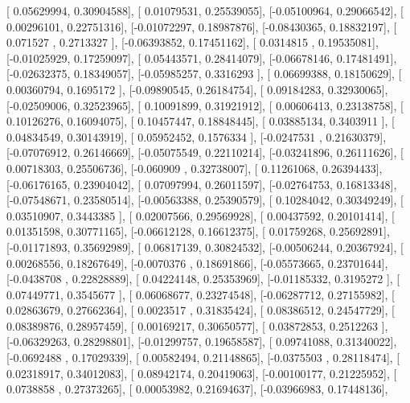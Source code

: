 \documentclass{article}
\begin{document}
       [ 0.05629994,  0.30904588],
       [ 0.01079531,  0.25539055],
       [-0.05100964,  0.29066542],
       [ 0.00296101,  0.22751316],
       [-0.01072297,  0.18987876],
       [-0.08430365,  0.18832197],
       [ 0.071527  ,  0.2713327 ],
       [-0.06393852,  0.17451162],
       [ 0.0314815 ,  0.19535081],
       [-0.01025929,  0.17259097],
       [ 0.05443571,  0.28414079],
       [-0.06678146,  0.17481491],
       [-0.02632375,  0.18349057],
       [-0.05985257,  0.3316293 ],
       [ 0.06699388,  0.18150629],
       [ 0.00360794,  0.1695172 ],
       [-0.09890545,  0.26184754],
       [ 0.09184283,  0.32930065],
       [-0.02509006,  0.32523965],
       [ 0.10091899,  0.31921912],
       [ 0.00606413,  0.23138758],
       [ 0.10126276,  0.16094075],
       [ 0.10457447,  0.18848445],
       [ 0.03885134,  0.3403911 ],
       [ 0.04834549,  0.30143919],
       [ 0.05952452,  0.1576334 ],
       [-0.0247531 ,  0.21630379],
       [-0.07076912,  0.26146669],
       [-0.05075549,  0.22110214],
       [-0.03241896,  0.26111626],
       [ 0.00718303,  0.25506736],
       [-0.060909  ,  0.32738007],
       [ 0.11261068,  0.26394433],
       [-0.06176165,  0.23904042],
       [ 0.07097994,  0.26011597],
       [-0.02764753,  0.16813348],
       [-0.07548671,  0.23580514],
       [-0.00563388,  0.25390579],
       [ 0.10284042,  0.30349249],
       [ 0.03510907,  0.3443385 ],
       [ 0.02007566,  0.29569928],
       [ 0.00437592,  0.20101414],
       [ 0.01351598,  0.30771165],
       [-0.06612128,  0.16612375],
       [ 0.01759268,  0.25692891],
       [-0.01171893,  0.35692989],
       [ 0.06817139,  0.30824532],
       [-0.00506244,  0.20367924],
       [ 0.00268556,  0.18267649],
       [-0.0070376 ,  0.18691866],
       [-0.05573665,  0.23701644],
       [-0.0438708 ,  0.22828889],
       [ 0.04224148,  0.25353969],
       [-0.01185332,  0.3195272 ],
       [ 0.07449771,  0.3545677 ],
       [ 0.06068677,  0.23274548],
       [-0.06287712,  0.27155982],
       [ 0.02863679,  0.27662364],
       [ 0.0023517 ,  0.31835424],
       [ 0.08386512,  0.24547729],
       [ 0.08389876,  0.28957459],
       [ 0.00169217,  0.30650577],
       [ 0.03872853,  0.2512263 ],
       [-0.06329263,  0.28298801],
       [-0.01299757,  0.19658587],
       [ 0.09741088,  0.31340022],
       [-0.0692488 ,  0.17029339],
       [ 0.00582494,  0.21148865],
       [-0.0375503 ,  0.28118474],
       [ 0.02318917,  0.34012083],
       [ 0.08942174,  0.20419063],
       [-0.00100177,  0.21225952],
       [ 0.0738858 ,  0.27373265],
       [ 0.00053982,  0.21694637],
       [-0.03966983,  0.17448136],
\end{document}
